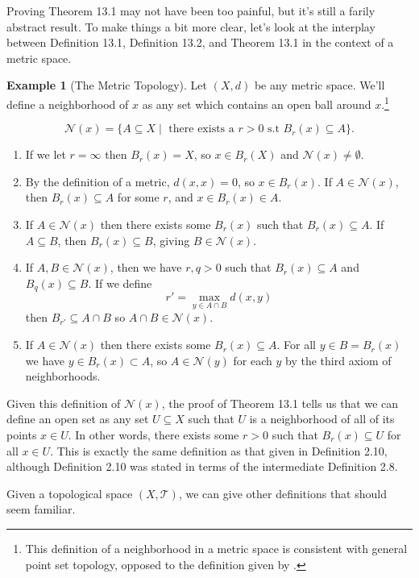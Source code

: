 \documentclass{article}
\newcommand{\T}{\mathcal{T}}
\theoremstyle{definition}
\newtheorem{example}{Example}[section]
\begin{document}
	Proving Theorem 13.1 may not have been too painful, but it's still a farily abstract result. To make things a bit more clear, let's look at the interplay between Definition 13.1, Definition 13.2, and Theorem 13.1 in the context of a metric space.
	
	\begin{example}[The Metric Topology]
		Let $(X,d)$ be any metric space. We'll define a neighborhood of $x$ as any set which contains an open ball around $x$.\footnote{This definition of a neighborhood in a metric space is consistent with general point set topology, opposed to the definition given by \cite{rudin1964principles}.}
		
		
		$$ \mathcal N(x) = \{A\subseteq X\mid \text{ there exists a }r>0\text{ s.t }B_r(x)\subseteq A \}.$$
		\begin{enumerate}
			\item If we let $r=\infty$ then $B_r(x)=X$, so $x\in B_r(X)$ and $\mathcal N(x)\neq\emptyset$.
			\item By the definition of a metric, $d(x,x)=0$, so $x\in B_r(x)$. If $A\in\mathcal N(x)$, then $B_r(x)\subseteq A$ for some $r$, and $x\in B_r(x)\in A$.
			\item If $A\in\mathcal N(x)$ then there exists some $B_r(x)$ such that $B_r(x)\subseteq A$. If $A\subseteq B$, then $B_r(x)\subseteq B$, giving $B\in\mathcal N(x)$.
			\item If $A,B\in\mathcal N(x)$, then we have $r,q>0$ such that $B_r(x)\subseteq A$ and $B_q(x)\subseteq B$. If we define $$ r' = \max_{y\in A\cap B}d(x,y)$$ then $B_{r'}\subseteq A\cap B$ so $A\cap B\in\mathcal N(x)$.
			\item If $A\in \mathcal N(x)$ then there exists some $B_r(x)\subseteq A$. For all $y\in B=B_r(x)$ we have $y\in B_r(x)\subset A$, so $A\in \mathcal N(y)$ for each $y$ by the third axiom of neighborhoods.
		\end{enumerate}
	
	Given this definition of $\mathcal N(x)$, the proof of Theorem 13.1 tells us that we can define an open set as any set $U\subseteq X$ such that $U$ is a neighborhood of all of its points $x\in U$. In other words, there exists some $r>0$ such that $B_r(x)\subseteq U$ for all $x\in U$. This is exactly the same definition as that given in Definition 2.10, although Definition 2.10 was stated in terms of the intermediate Definition 2.8. 
	\end{example}

	Given a topological space $(X,\T)$, we can give other definitions that should seem familiar.
	
\end{document}
